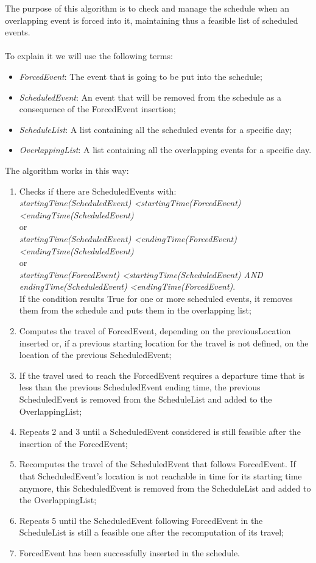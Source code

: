 The purpose of this algorithm is to check and manage the schedule when an overlapping event is forced into it, maintaining thus a feasible list of scheduled events. \\ \\
To explain it we will use the following terms: 
\begin{itemize}
	\item \textit{ForcedEvent}: The event that is going to be put into the schedule;
	\item \textit{ScheduledEvent}: An event that will be removed from the schedule as a consequence of the ForcedEvent insertion;
	\item \textit{ScheduleList}: A list containing all the scheduled events for a specific day;
	\item \textit{OverlappingList}: A list containing all the overlapping events for a specific day.
\end{itemize}
\newpage
\noindent The algorithm works in this way:
\begin{enumerate}
	\item Checks if there are ScheduledEvents with: \\ \textit{startingTime(ScheduledEvent) \textless startingTime(ForcedEvent) \textless endingTime(ScheduledEvent)} \\ or \\ \textit{startingTime(ScheduledEvent) \textless endingTime(ForcedEvent) \textless endingTime(ScheduledEvent)} \\
or \\ \textit{startingTime(ForcedEvent) \textless startingTime(ScheduledEvent) AND \\endingTime(ScheduledEvent) \textless endingTime(ForcedEvent)}. \\
	If the condition results True for one or more scheduled events, it removes them from the schedule and puts them in the overlapping list;
	\item Computes the travel of ForcedEvent, depending on the previousLocation inserted or, if a previous starting location for the travel is not defined, on the location of the previous ScheduledEvent;
	\item If the travel used to reach the ForcedEvent requires a departure time that is less than the previous ScheduledEvent ending time, the previous ScheduledEvent is removed from the ScheduleList and added to the OverlappingList;
	\item Repeats 2 and 3 until a ScheduledEvent considered is still feasible after the insertion of the ForcedEvent;
	\item Recomputes the travel of the ScheduledEvent that follows ForcedEvent. If that ScheduledEvent's location is not reachable in time for its starting time anymore, this ScheduledEvent is removed from the ScheduleList and added to the OverlappingList;
	\item Repeats 5 until the ScheduledEvent following ForcedEvent in the ScheduleList is still a feasible one after the recomputation of its travel;
	\item ForcedEvent has been successfully inserted in the schedule.
\end{enumerate}